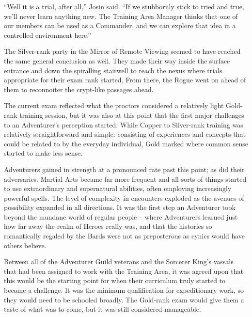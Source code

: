  

“Well it is a trial, after all,” Josin said. “If we stubbornly stick to tried and true, we’ll never learn anything new. The Training Area Manager thinks that one of our members can be used as a Commander, and we can explore that idea in a controlled environment here.”

 

The Silver-rank party in the Mirror of Remote Viewing seemed to have reached the same general conclusion as well. They made their way inside the surface entrance and down the spiralling stairwell to reach the nexus where trials appropriate for their exam rank started. From there, the Rogue went on ahead of them to reconnoiter the crypt-like passages ahead.

 

The current exam reflected what the proctors considered a relatively light Gold-rank training session, but it was also at this point that the first major challenges to an Adventurer’s perception started. While Copper to Silver-rank training was relatively straightforward and simple: consisting of experiences and concepts that could be related to by the everyday individual, Gold marked where common sense started to make less sense.

 

Adventurers gained in strength at a pronounced rate past this point; as did their adversaries. Martial Arts became far more frequent and all sorts of things started to use extraordinary and supernatural abilities, often employing increasingly powerful spells. The level of complexity in encounters exploded as the avenues of possibility expanded in all directions. It was the first step an Adventurer took beyond the mundane world of regular people – where Adventurers learned just how far away the realm of Heroes really was, and that the histories so romantically regaled by the Bards were not as preposterous as cynics would have others believe.

 

Between all of the Adventurer Guild veterans and the Sorcerer King’s vassals that had been assigned to work with the Training Area, it was agreed upon that this would be the starting point for when their curriculum truly started to become a challenge. It was the minimum qualification for expeditionary work, so they would need to be schooled broadly. The Gold-rank exam would give them a taste of what was to come, but it was still considered manageable.

 


